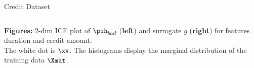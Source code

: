 \documentclass[11pt,compress,t,notes=noshow, xcolor=table]{beamer}
\begin{document}
\begin{vbframe}{Credit Dataset}
\begin{columns}
\begin{column}{0.46\textwidth}
	\end{column}
\end{columns}
\vspace{-0.4cm}
\begin{center}
		\tiny{\textbf{Figures:} 2-dim ICE plot of $\pih_{bad}$ (\textbf{left}) and surrogate $g$ (\textbf{right}) for features duration and credit amount. \\The white dot is $\xv$. The histograms display the marginal distribution of the training data $\Xmat$.}
\end{center}

\end{vbframe}

%
%
%
\end{document}
